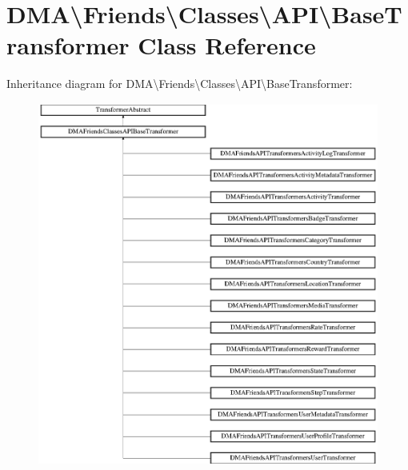 \hypertarget{classDMA_1_1Friends_1_1Classes_1_1API_1_1BaseTransformer}{}\section{D\+M\+A\textbackslash{}Friends\textbackslash{}Classes\textbackslash{}A\+P\+I\textbackslash{}Base\+Transformer Class Reference}
\label{classDMA_1_1Friends_1_1Classes_1_1API_1_1BaseTransformer}
Inheritance diagram for D\+M\+A\textbackslash{}Friends\textbackslash{}Classes\textbackslash{}A\+P\+I\textbackslash{}Base\+Transformer\+:\begin{figure}[H]
\begin{center}
\leavevmode
\includegraphics[height=12.000000cm]{d6/d13/classDMA_1_1Friends_1_1Classes_1_1API_1_1BaseTransformer}
\end{center}
\end{figure}
